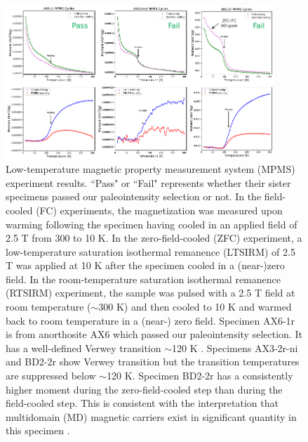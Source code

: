 \clearpage

\begin{figure}
\noindent\includegraphics[width=0.9\textwidth]{figure/Zhang2022/MPMS.pdf}
\centering
\caption{{Low-temperature magnetic property measurement system (MPMS) experiment results. ``Pass" or ``Fail" represents whether their sister specimens passed our paleointensity selection or not. In the field-cooled (FC) experiments, the magnetization was measured upon warming following the specimen having cooled in an applied field of 2.5 T from 300 to 10 K. In the zero-field-cooled (ZFC) experiment, a low-temperature saturation isothermal remanence (LTSIRM) of 2.5 T was applied at 10 K after the specimen cooled in a (near-)zero field. In the room-temperature saturation isothermal remanence (RTSIRM) experiment, the sample was pulsed with a 2.5 T field at room temperature ($\sim$300 K) and then cooled to 10 K and warmed back to room temperature in a (near-) zero field. Specimen AX6-1r is from anorthosite AX6 which passed our paleointensity selection. It has a well-defined Verwey transition $\sim$120 K \cite{Verwey1939a}. Specimens AX3-2r-ni and BD2-2r show Verwey transition but the transition temperatures are suppressed below $\sim$120 K. Specimen BD2-2r has a consistently higher moment during the zero-field-cooled step than during the field-cooled step. This is consistent with the interpretation that multidomain (MD) magnetic carriers exist in significant quantity in this specimen \cite{Carter-Stiglitz2006a}.}}
\label{fig:MPMS}
\end{figure}

\clearpage


